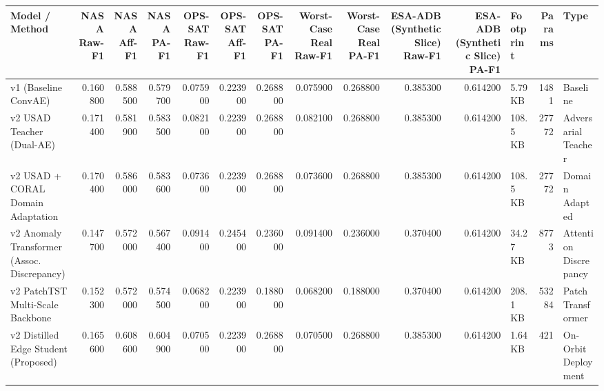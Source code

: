 \begin{tabular}{lrrrrrrrrrrlrl}
\toprule
Model / Method & NASA Raw-F1 & NASA Aff-F1 & NASA PA-F1 & OPS-SAT Raw-F1 & OPS-SAT Aff-F1 & OPS-SAT PA-F1 & Worst-Case Real Raw-F1 & Worst-Case Real PA-F1 & ESA-ADB (Synthetic Slice) Raw-F1 & ESA-ADB (Synthetic Slice) PA-F1 & Footprint & Params & Type \\
\midrule
v1 (Baseline ConvAE) & 0.160800 & 0.588500 & 0.579700 & 0.075900 & 0.223900 & 0.268800 & 0.075900 & 0.268800 & 0.385300 & 0.614200 & 5.79 KB & 1481 & Baseline \\
v2 USAD Teacher (Dual-AE) & 0.171400 & 0.581900 & 0.583500 & 0.082100 & 0.223900 & 0.268800 & 0.082100 & 0.268800 & 0.385300 & 0.614200 & 108.5 KB & 27772 & Adversarial Teacher \\
v2 USAD + CORAL Domain Adaptation & 0.170400 & 0.586000 & 0.583600 & 0.073600 & 0.223900 & 0.268800 & 0.073600 & 0.268800 & 0.385300 & 0.614200 & 108.5 KB & 27772 & Domain Adapted \\
v2 Anomaly Transformer (Assoc. Discrepancy) & 0.147700 & 0.572000 & 0.567400 & 0.091400 & 0.245400 & 0.236000 & 0.091400 & 0.236000 & 0.370400 & 0.614200 & 34.27 KB & 8773 & Attention Discrepancy \\
v2 PatchTST Multi-Scale Backbone & 0.152300 & 0.572000 & 0.574500 & 0.068200 & 0.223900 & 0.188000 & 0.068200 & 0.188000 & 0.370400 & 0.614200 & 208.1 KB & 53284 & Patch Transformer \\
v2 Distilled Edge Student (Proposed) & 0.165600 & 0.608600 & 0.604900 & 0.070500 & 0.223900 & 0.268800 & 0.070500 & 0.268800 & 0.385300 & 0.614200 & 1.64 KB & 421 & On-Orbit Deployment \\
\bottomrule
\end{tabular}
